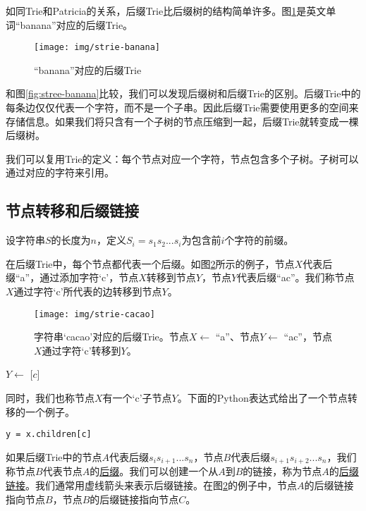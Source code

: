 \documentclass{ctexart}
\begin{document}
如同Trie和Patricia的关系，后缀Trie比后缀树的结构简单许多。图\ref{fig:strie-banana}是英文单词“banana”对应的后缀Trie。

\begin{figure}[htbp]
  \centering
  \texttt{[image: img/strie-banana]}
  \caption{“banana”对应的后缀Trie} \label{fig:strie-banana}
\end{figure}

和图\ref{fig:stree-banana}比较，我们可以发现后缀树和后缀Trie的区别。后缀Trie中的每条边仅仅代表一个字符，而不是一个子串。因此后缀Trie需要使用更多的空间来存储信息。如果我们将只含有一个子树的节点压缩到一起，后缀Trie就转变成一棵后缀树。

我们可以复用Trie的定义：每个节点对应一个字符，节点包含多个子树。子树可以通过对应的字符来引用。

\subsection{节点转移和后缀链接}

设字符串$S$的长度为$n$，定义$S_i=s_1s_2...s_i$为包含前$i$个字符的前缀。

在后缀Trie中，每个节点都代表一个后缀。如图\ref{fig:strie-cacao}所示的例子，节点$X$代表后缀“a”，通过添加字符‘c’，节点$X$转移到节点$Y$，节点$Y$代表后缀“ac”。我们称节点$X$通过字符‘c’所代表的边转移到节点$Y$\cite{ukkonen95}。

\begin{figure}[htbp]
  \centering
  \texttt{[image: img/strie-cacao]}
  \caption{字符串‘cacao’对应的后缀Trie。节点$X \gets$ “a”、节点$Y \gets$ “ac”，节点$X$通过字符‘c’转移到$Y$。}
  \label{fig:strie-cacao}
\end{figure}

\begin{algorithmic}
\State $Y \gets$ [$c$]
\end{algorithmic}

同时，我们也称节点$X$有一个‘c’子节点$Y$。下面的Python表达式给出了一个节点转移的一个例子。

\lstset{language=python}
\begin{lstlisting}
y = x.children[c]
\end{lstlisting}

如果后缀Trie中的节点$A$代表后缀$s_is_{i+1}...s_n$，节点$B$代表后缀$s_{i+1}s_{i+2}...s_n$，我们称节点$B$代表节点$A$的\underline{后缀}。我们可以创建一个从$A$到$B$的链接，称为节点$A$的\underline{后缀链接}\cite{ukkonen95}。我们通常用虚线箭头来表示后缀链接。在图\ref{fig:strie-cacao}的例子中，节点$A$的后缀链接指向节点$B$，节点$B$的后缀链接指向节点$C$。
\end{document}
